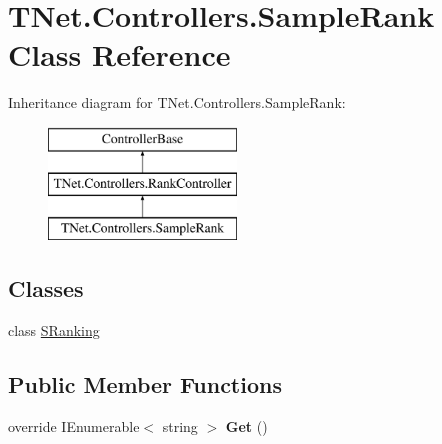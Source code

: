 \hypertarget{class_t_net_1_1_controllers_1_1_sample_rank}{}\section{T\+Net.\+Controllers.\+Sample\+Rank Class Reference}
\label{class_t_net_1_1_controllers_1_1_sample_rank}
Inheritance diagram for T\+Net.\+Controllers.\+Sample\+Rank\+:\begin{figure}[H]
\begin{center}
\leavevmode
\includegraphics[height=3.000000cm]{class_t_net_1_1_controllers_1_1_sample_rank}
\end{center}
\end{figure}
\subsection*{Classes}
\begin{DoxyCompactItemize}
\item 
class \mbox{\hyperlink{class_t_net_1_1_controllers_1_1_sample_rank_1_1_s_ranking}{S\+Ranking}}
\end{DoxyCompactItemize}
\subsection*{Public Member Functions}
\begin{DoxyCompactItemize}
\item 
\mbox{\label{class_t_net_1_1_controllers_1_1_sample_rank_a6d0fc56fae7cbab46d60f61751c11d74}} 
override I\+Enumerable$<$ string $>$ {\bfseries Get} ()
\end{DoxyCompactItemize}
